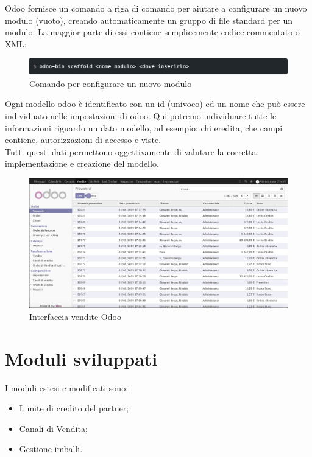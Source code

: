 Odoo fornisce un comando a riga di comando per aiutare a configurare un nuovo modulo (vuoto), creando automaticamente un gruppo di file standard per un modulo. La maggior parte di essi contiene semplicemente codice commentato o XML:
\begin{figure}[H]
	\begin{center} \includegraphics[scale=0.6]{figures/scaffold}
		\caption[Comando per configurare un nuovo modulo]{Comando per configurare un nuovo modulo}
		\label{fig:scaffold}
	\end{center}
\end{figure}
\newpage
Ogni modello odoo è identificato con un id (univoco) ed un nome che può essere individuato nelle impostazioni di odoo. Qui potremo individuare tutte le informazioni riguardo un dato modello, ad esempio: chi eredita, che campi contiene, autorizzazioni di accesso e viste. \\
Tutti questi dati permettono oggettivamente di valutare la corretta implementazione e creazione del modello.

\begin{figure}[H]
	\begin{center} \includegraphics[scale=0.35]{figures/saleorder}
		\caption[Interfaccia vendite Odoo]{Interfaccia vendite Odoo}
		\label{fig:sale_order}
	\end{center}
\end{figure}
\newpage
\section{Moduli sviluppati}

I moduli estesi e modificati sono: \begin{itemize}
	\item Limite di credito del partner;
	\item Canali di Vendita;
	\item Gestione imballi.
\end{itemize}

